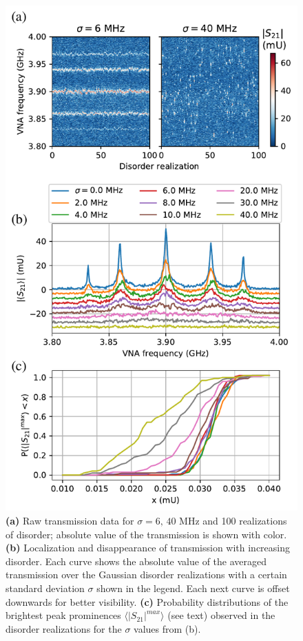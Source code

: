 \documentclass[%
 aps, prl,
 amsmath,amssymb,
 reprint,%
superscriptaddress
]{revtex4-2}
\begin{document}
\begin{figure}
	\includegraphics[width=1\linewidth]{Pictures/mbl}
	\caption{\textbf{(a)} Raw transmission data for $\sigma = 6,\, 40$ MHz and 100 realizations of disorder; absolute value of the transmission is shown with color. \textbf{(b)} Localization and disappearance of transmission with increasing disorder. Each curve shows the absolute value of the averaged transmission over the Gaussian disorder realizations with a certain standard deviation $\sigma$ shown in the legend. Each next curve is offset downwards for better visibility. \textbf{(c)} Probability distributions of the brightest peak prominences $\langle |S_{21}|^{max}\rangle$ (see text) observed in the disorder realizations for the $\sigma$ values from (b).}
	\label{fig:mbl}
\end{figure}
\end{document}
